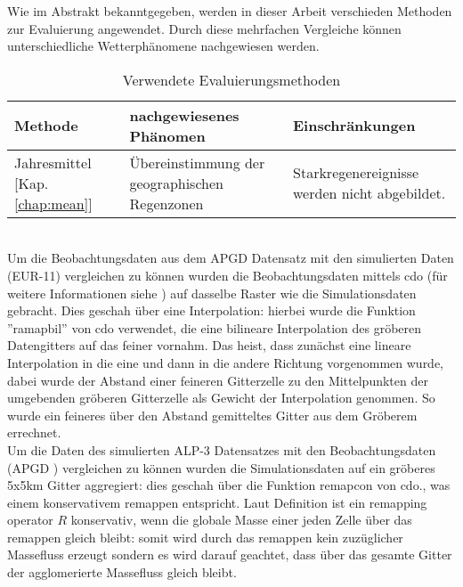 Wie im Abstrakt bekanntgegeben, werden in dieser Arbeit verschieden Methoden zur Evaluierung angewendet. Durch diese mehrfachen Vergleiche können unterschiedliche Wetterphänomene nachgewiesen werden.\\

\begin{table}[h]
	\begin{tabularx}{\textwidth}{|X|X|X|}
		\hline
		\textbf{Methode} & \textbf{nachgewiesenes Phänomen}& \textbf{Einschränkungen}\\
		\hline
		Jahresmittel [Kap. \ref{chap:mean}] & Übereinstimmung der geographischen Regenzonen & Starkregenereignisse werden nicht abgebildet.\\
		\hline
	\end{tabularx}
\caption{Verwendete Evaluierungsmethoden}
\end{table}
\hfill\\
Um die Beobachtungsdaten aus dem APGD\cite{meteoswiss} Datensatz mit den simulierten Daten (EUR-11) vergleichen zu können wurden die Beobachtungsdaten mittels cdo (für weitere Informationen siehe \cite{cdo}) auf dasselbe Raster wie die Simulationsdaten gebracht. Dies geschah über eine Interpolation: hierbei wurde die Funktion ''ramapbil'' von cdo verwendet, die eine bilineare Interpolation des gröberen Datengitters auf das feiner vornahm. Das heist, dass zunächst eine lineare Interpolation in die eine und dann in die andere Richtung vorgenommen wurde, dabei wurde der Abstand einer feineren Gitterzelle zu den Mittelpunkten der umgebenden gröberen Gitterzelle als Gewicht der Interpolation genommen. So wurde ein feineres über den Abstand gemitteltes Gitter aus dem Gröberem errechnet.\\
Um die Daten des simulierten ALP-3 Datensatzes mit den Beobachtungsdaten (APGD \cite{meteoswiss}) vergleichen zu können wurden die Simulationsdaten auf ein gröberes 5x5km Gitter aggregiert: dies geschah über die Funktion remapcon von cdo., was einem konservativem remappen entspricht. Laut Definition \cite{remapcon} ist ein remapping operator $R$ konservativ, wenn die globale Masse einer jeden Zelle über das remappen gleich bleibt: somit wird durch das remappen kein zuzüglicher Massefluss erzeugt sondern es wird darauf geachtet, dass über das gesamte Gitter der agglomerierte Massefluss gleich bleibt.